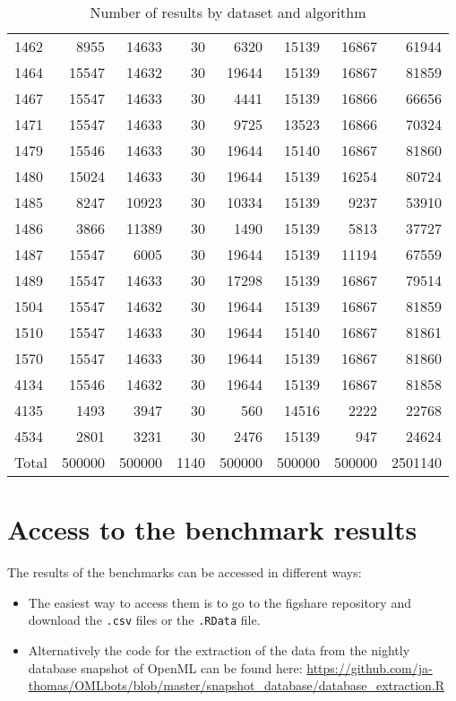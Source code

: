 \documentclass{article}
\begin{document}
\begin{table}[ht]
\begin{tabular}{lrrrrrrr}
  1462 & 8955 & 14633 & 30 & 6320 & 15139 & 16867 & 61944 \\ 
  1464 & 15547 & 14632 & 30 & 19644 & 15139 & 16867 & 81859 \\ 
  1467 & 15547 & 14633 & 30 & 4441 & 15139 & 16866 & 66656 \\ 
  1471 & 15547 & 14633 & 30 & 9725 & 13523 & 16866 & 70324 \\ 
  1479 & 15546 & 14633 & 30 & 19644 & 15140 & 16867 & 81860 \\ 
  1480 & 15024 & 14633 & 30 & 19644 & 15139 & 16254 & 80724 \\ 
  1485 & 8247 & 10923 & 30 & 10334 & 15139 & 9237 & 53910 \\ 
  1486 & 3866 & 11389 & 30 & 1490 & 15139 & 5813 & 37727 \\ 
  1487 & 15547 & 6005 & 30 & 19644 & 15139 & 11194 & 67559 \\ 
  1489 & 15547 & 14633 & 30 & 17298 & 15139 & 16867 & 79514 \\ 
  1504 & 15547 & 14632 & 30 & 19644 & 15139 & 16867 & 81859 \\ 
  1510 & 15547 & 14633 & 30 & 19644 & 15140 & 16867 & 81861 \\ 
  1570 & 15547 & 14633 & 30 & 19644 & 15139 & 16867 & 81860 \\ 
  4134 & 15546 & 14632 & 30 & 19644 & 15139 & 16867 & 81858 \\ 
  4135 & 1493 & 3947 & 30 & 560 & 14516 & 2222 & 22768 \\ 
  4534 & 2801 & 3231 & 30 & 2476 & 15139 & 947 & 24624 \\ 
   \hline
Total & 500000 & 500000 & 1140 & 500000 & 500000 & 500000 & 2501140 \\ 
   \hline
\end{tabular}
\endgroup
\caption{Number of results by dataset and algorithm} 
\label{tab:datasets2}
\end{table}
\section{Access to the benchmark results}

The results of the benchmarks can be accessed in different ways:

\begin{itemize}
\item The easiest way to access them is to go to the figshare repository \citep{Probst2018} and
download the \texttt{.csv} files or the \texttt{.RData} file. 
\item Alternatively the code for the extraction of the data from the nightly database snapshot of OpenML can 
be found here: \url{https://github.com/ja-thomas/OMLbots/blob/master/snapshot_database/database_extraction.R}
\end{itemize}
\end{document}
